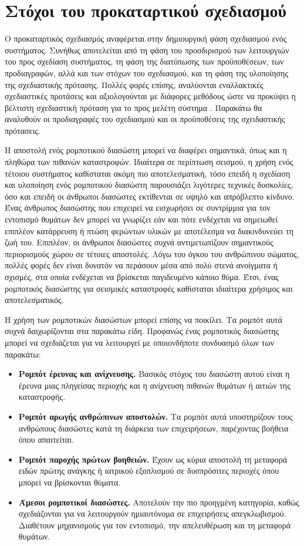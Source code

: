 \section{Στόχοι του προκαταρτικού σχεδιασμού}

Ο προκαταρτικός σχεδιασμός αναφέρεται στην δημιουργική φάση σχεδιασμού ενός συστήματος. Συνήθως αποτελείται από τη φάση του προσδιρισμού των λειτουργιών του προς σχεδίαση συστήματος, τη φάση της διατύπωσης των προϋποθέσεων, των προδιαγραφών, αλλά και των στόχων του σχεδιασμού, και τη φάση της υλοποίησης της σχεδιαστικής πρότασης. Πολλές φορές επίσης, αναλύονται εναλλακτικές σχεδιαστικές προτάσεις και αξιολογούνται με διάφορες μεθόδους ώστε να προκύψει η βέλτιστη σχεδιαστική πρόταση για το προς μελέτη σύστημα \cite{designArgyris}. Παρακάτω θα αναλυθούν οι προδιαγραφές του σχεδιασμού και οι προϋποθέσεις της σχειδαστικής πρότασεις.
\par Η αποστολή ενός ρομποτικού διασώστη μπορεί να διαφέρει σημαντικά, όπως και η πληθώρα των πιθανών καταστροφών. Ιδιαίτερα σε περίπτωση σεισμού, η χρήση ενός τέτοιου συστήματος καθίσταται ακόμη πιο αποτελεσματική, τόσο επειδή η σχεδίαση και υλοποίηση ενός ρομποτικού διασώστη παρουσιάζει λιγότερες τεχνικές δυσκολίες, όσο και επειδή οι άνθρωποι διασώστες εκτίθενται σε υψηλό και απρόβλεπτο κίνδυνο. Ένας άνθρωπος διασώστης που επιχειρεί να εισχωρήσει σε συντρίμμια για τον εντοπισμό θυμάτων δεν μπορεί να γνωρίζει εάν και πότε ενδέχεται να σημειωθεί επιπλέον κατάρρευση ή πτώση φερώντων υλικών με αποτέλεσμα να διακινδυνεύει τη ζωή του. Επιπλέον, οι άνθρωποι διασώστες συχνά αντιμετωπίζουν σημαντικούς περιορισμούς χώρου σε τέτοιες αποστολές. Λόγω του όγκου του ανθρώπινου σώματος, πολλές φορές δεν είναι δυνατόν να περάσουν μέσα από πολύ στενά ανοίγματα ή σχισμές, στα οποία ενδέχεται να βρίσκεται παγιδευμένο κάποιο θύμα. Έτσι, ένας ρομποτικός διασώστης για σεισμικές καταστροφές καθίσταται ιδιαίτερα χρήσιμος και αποτελεσματικός.
\par Η χρήση των ρομποτικών διασώστων μπορεί επίσης να ποικίλει. Τα ρομπότ αυτά συχνά δαιχωρίζονται στα παρακάτω είδη. Προφανώς ένας ρομποτικός διασώστης μπορεί να σχεδιάζεται για να λειτουργεί με οποιονδήποτε συνδυασμό όλων των παρακάτω:
\begin{itemize}
    \item \textbf{Ρομπότ έρευνας και ανίχνευσης.} Βασικός στόχος του διασώστη αυτού είναι η έρευνα μιας πληγείσας περιοχής και η ανίχνευση πιθανών θυμάτων ή αιτιών της καταστροφής.
    \item \textbf{Ρομπότ αρωγής ανθρώπινων αποστολών.} Τα ρομπότ αυτά υποστηρίζουν τους ανθρώπους διασώστες κατά τη διάρκεια των επιχειρήσεων, παρέχοντας βοήθεια όπου απαιτείται.
    \item \textbf{Ρομπότ παροχής πρώτων βοηθειών.} Έχουν ως κύρια αποστολή τη μεταφορά ειδών πρώτης ανάγκης ή ιατρικού εξοπλισμού σε δυσπρόσιτες περιοχές όπου μπορεί να βρίσκονται θύματα.
    \item \textbf{Άμεσοι ρομποτικοί διασώστες.} Αποτελούν την πιο προηγμένη κατηγορία, καθώς σχεδιάζονται για να λειτουργούν ημιαυτόνομα σε επιχειρήσεις απεγκλωβισμού. Διαθέτουν μηχανισμούς για τον εντοπισμό, την απελευθέρωση και τη μεταφορά θυμάτων.
\end{itemize} 
